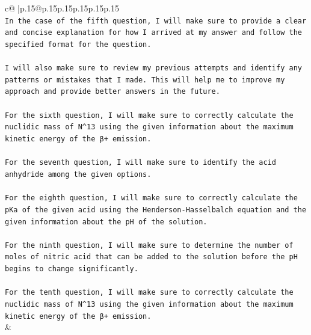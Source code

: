 \documentclass{article}
\begin{document}
{\begin{supertabular}{c@{$\;$}|p{.15\linewidth}@{}p{.15\linewidth}p{.15\linewidth}p{.15\linewidth}p{.15\linewidth}p{.15\linewidth}}
{{{\\ 
\texttt{In the case of the fifth question, I will make sure to provide a clear and concise explanation for how I arrived at my answer and follow the specified format for the question.} \\
\\ 
\texttt{I will also make sure to review my previous attempts and identify any patterns or mistakes that I made. This will help me to improve my approach and provide better answers in the future.} \\
\\ 
\texttt{For the sixth question, I will make sure to correctly calculate the nuclidic mass of N\^{}13 using the given information about the maximum kinetic energy of the β+ emission.} \\
\\ 
\texttt{For the seventh question, I will make sure to identify the acid anhydride among the given options.} \\
\\ 
\texttt{For the eighth question, I will make sure to correctly calculate the pKa of the given acid using the Henderson{-}Hasselbalch equation and the given information about the pH of the solution.} \\
\\ 
\texttt{For the ninth question, I will make sure to determine the number of moles of nitric acid that can be added to the solution before the pH begins to change significantly.} \\
\\ 
\texttt{For the tenth question, I will make sure to correctly calculate the nuclidic mass of N\^{}13 using the given information about the maximum kinetic energy of the β+ emission.} \\
            }
        }
    }
    & \\ \\

\end{supertabular}
}
\end{document}
